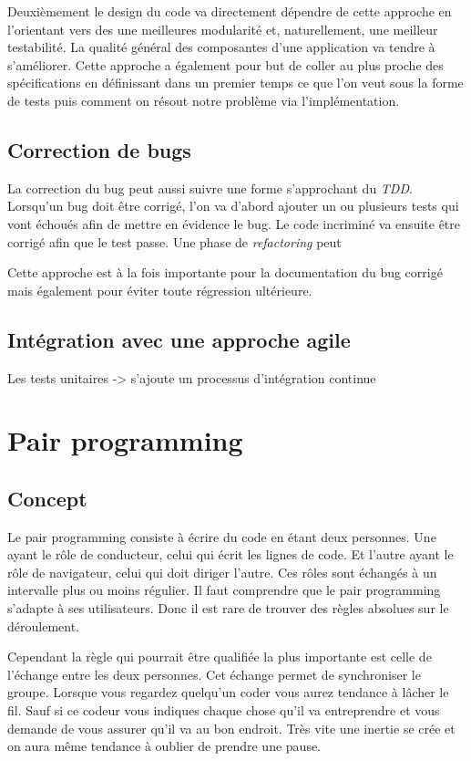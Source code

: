 \documentclass[journal, a4paper, frenchb]{IEEEtran}
\begin{document}
Deuxièmement le design du code va directement dépendre de cette approche en l'orientant vers des une meilleures modularité et, naturellement, une meilleur testabilité. La qualité général des composantes d'une application va tendre à s'améliorer. Cette approche a également pour but de coller au plus proche des spécifications en définissant dans un premier temps ce que l'on veut sous la forme de tests puis comment on résout notre problème via l'implémentation.


\subsection{Correction de bugs}

La correction du bug peut aussi suivre une forme s'approchant du \emph{TDD}. Lorsqu'un bug doit être corrigé, l'on va d'abord ajouter un ou plusieurs tests qui vont échoués afin de mettre en évidence le bug. Le code incriminé va ensuite être corrigé afin que le test passe. Une phase de \emph{refactoring} peut

Cette approche est à la fois importante pour la documentation du bug corrigé mais également pour éviter toute régression ultérieure.


\subsection{Intégration avec une approche agile}

Les tests unitaires -> s'ajoute un processus d'intégration continue



\section{Pair programming}
\subsection{Concept}
Le pair programming consiste à écrire du code en étant deux personnes. Une ayant le rôle de
conducteur, celui qui écrit les lignes de code. Et l’autre ayant le rôle de navigateur, celui qui doit
diriger l’autre. Ces rôles sont échangés à un intervalle plus ou moins régulier. Il faut comprendre que
le pair programming s’adapte à ses utilisateurs. Donc il est rare de trouver des règles absolues sur le
déroulement.

Cependant la règle qui pourrait être qualifiée la plus importante est celle de l’échange entre les deux
personnes. Cet échange permet de synchroniser le groupe. Lorsque vous regardez quelqu’un coder
vous aurez tendance à lâcher le fil. Sauf si ce codeur vous indiques chaque chose qu’il va
entreprendre et vous demande de vous assurer qu’il va au bon endroit. Très vite une inertie se crée
et on aura même tendance à oublier de prendre une pause.
\end{document}
